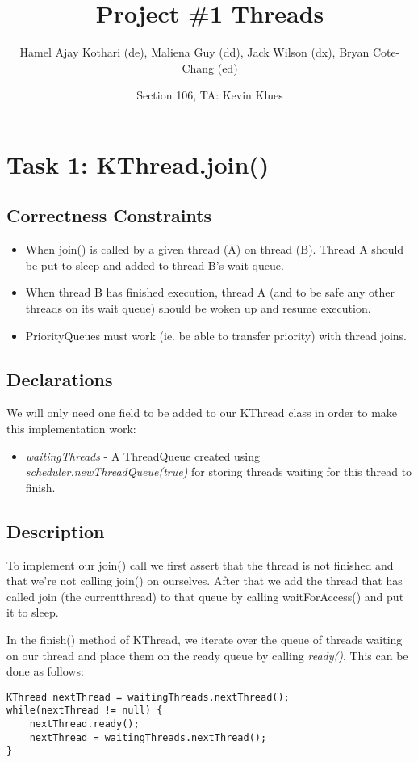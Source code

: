 \documentclass{article}
\begin{document}
\title{Project \#1 Threads}
\author{Hamel Ajay Kothari (de), Maliena Guy (dd), Jack Wilson (dx), Bryan Cote-Chang (ed)}
\date{Section 106, TA: Kevin Klues}
\maketitle

\section*{Task 1: KThread.join()}

\subsection*{Correctness Constraints}
\begin{itemize}
\item When join() is called by a given thread (A) on thread (B). Thread A should be put to sleep and added to thread
B's wait queue.
\item When thread B has finished execution, thread A (and to be safe any other threads on its wait queue) should be
woken up and resume execution.
\item PriorityQueues must work (ie. be able to transfer priority) with thread joins.
\end{itemize}

\subsection*{Declarations}
We will only need one field to be added to our KThread class in order to make this implementation work:
\begin{itemize}
\item \textit{waitingThreads} - A ThreadQueue created using \textit{scheduler.newThreadQueue(true)} for storing
threads waiting for this thread to finish.
\end{itemize}

\subsection*{Description}
To implement our join() call we first assert that the thread is not finished and that
we're not calling join() on ourselves.  After that we add the thread that has called join (the currentthread) 
to that queue by calling waitForAccess() and put it to sleep.

In the finish() method of KThread, we iterate over the queue of threads waiting on our thread and place them on the
ready queue by calling \textit{ready()}. This can be done as follows:
\begin{lstlisting}
KThread nextThread = waitingThreads.nextThread();
while(nextThread != null) {
    nextThread.ready();
    nextThread = waitingThreads.nextThread();
}
\end{lstlisting}
\end{document}
